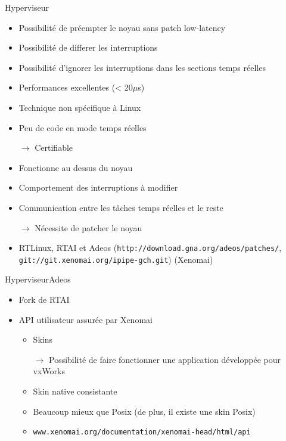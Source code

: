 \begin{frame}[fagile]{Hyperviseur}
  \begin{itemize}
   \item Possibilité de préempter le noyau sans patch low-latency
   \item Possibilité de differer les interruptions
   \item  Possibilité d'ignorer  les interruptions  dans  les sections
     temps réelles
   \item Performances excellentes (< 20$\mu$s)
   \item Technique non spécifique à Linux
   \item Peu de code en mode temps réelles
   \item[$\to$] Certifiable

   \item Fonctionne au dessus du noyau
   \item Comportement des interruptions à modifier
   \item Communication entre les tâches temps réelles et le reste
   \item[$\to$] Nécessite de patcher le noyau
   
   \item           RTLinux,           RTAI          et           Adeos
     (\texttt{http://download.gna.org/adeos/patches/},
     \texttt{git://git.xenomai.org/ipipe-gch.git}) (Xenomai)
  \end{itemize}
\end{frame}

\begin{frame}{Hyperviseur}{Adeos}
  \begin{itemize}
    \item Fork de RTAI
    \item API utilisateur assurée par Xenomai
    \begin{itemize}
      \item Skins 
      \item[$\to$]  Possibilité de  faire fonctionner  une application
        développée pour vxWorks
      \item Skin native consistante
      \item Beaucoup mieux que Posix (de plus, il existe une skin Posix)
      \item \texttt{www.xenomai.org/documentation/xenomai-head/html/api}
    \end{itemize}
  \end{itemize}
\end{frame}

